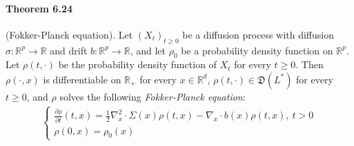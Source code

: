 \documentclass{article}
\numberwithin{equation}{section}
\theoremstyle{plain}
\theoremstyle{definition}
\begin{document}
\paragraph{Theorem 6.24\label{thm:6.24}} (Fokker-Planck equation). Let $(X_t)_{t\geq 0}$ be a diffusion process with diffusion $\sigma:\mathbb{R}^p\to\mathbb{R}$ and drift $b:\mathbb{R}^p\to\mathbb{R}$, and let $\rho_0$ be a probability density function on $\mathbb{R}^p$. Let $\rho(t,\cdot)$ be the probability density function of $X_t$ for every $t\geq 0$. Then $\rho(\cdot,x)$ is differentiable on $\mathbb{R}_+$ for every $x\in\mathbb{R}^d$, $\rho(t,\cdot)\in\mathfrak{D}(L^*)$ for every $t\geq 0$, and $\rho$ solves the following \textit{Fokker-Planck equation}:
\begin{align*}
	\begin{cases}
		\frac{\partial\rho}{\partial t}(t,x) = \frac{1}{2}\nabla^2_x\cdot\Sigma(x)\rho(t,x) - \nabla_x\cdot b(x)\rho(t,x),\ t>0\\
		\rho(0,x)=\rho_0(x)
	\end{cases}
\end{align*}
\end{document}
